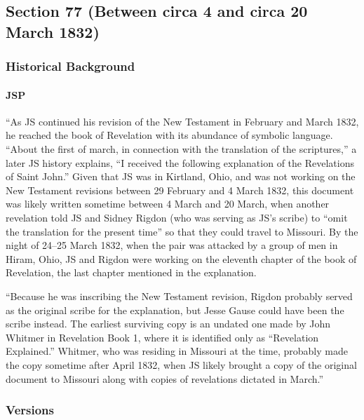 \subsection{Section 77 (Between circa 4 and circa 20 March 1832)}
	\label{DC77}
	
	\subsubsection{Historical Background}
		\label{DC77-HB}
		
		\paragraph{JSP}
		
			``As JS continued his revision of the New Testament in February and March 1832, he reached the book of Revelation with its abundance of symbolic language. ``About the first of march, in connection with the translation of the scriptures,'' a later JS history explains, ``I received the following explanation of the Revelations of Saint John.'' Given that JS was in Kirtland, Ohio, and was not working on the New Testament revisions between 29 February and 4 March 1832, this document was likely written sometime between 4 March and 20 March, when another revelation told JS and Sidney Rigdon (who was serving as JS's scribe) to ``omit the translation for the present time'' so that they could travel to Missouri. By the night of 24--25 March 1832, when the pair was attacked by a group of men in Hiram, Ohio, JS and Rigdon were working on the eleventh chapter of the book of Revelation, the last chapter mentioned in the explanation.
			
			``Because he was inscribing the New Testament revision, Rigdon probably served as the original scribe for the explanation, but Jesse Gause could have been the scribe instead. The earliest surviving copy is an undated one made by John Whitmer in Revelation Book 1, where it is identified only as ``Revelation Explained.'' Whitmer, who was residing in Missouri at the time, probably made the copy sometime after April 1832, when JS likely brought a copy of the original document to Missouri along with copies of revelations dictated in March.''
		
	\subsubsection{Versions}
		\label{DC77-V}
		
